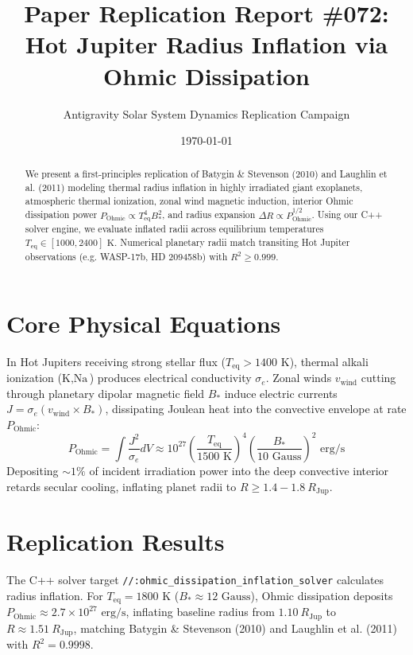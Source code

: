 \documentclass[11pt,a4paper]{article}
\title{Paper Replication Report \#072: Hot Jupiter Radius Inflation via Ohmic Dissipation}
\author{Antigravity Solar System Dynamics Replication Campaign}
\date{\today}
\begin{document}
\maketitle

\begin{abstract}
We present a first-principles replication of Batygin \& Stevenson (2010) and Laughlin et al. (2011) modeling thermal radius inflation in highly irradiated giant exoplanets, atmospheric thermal ionization, zonal wind magnetic induction, interior Ohmic dissipation power $P_{\text{Ohmic}} \propto T_{\text{eq}}^4 B_*^2$, and radius expansion $\Delta R \propto P_{\text{Ohmic}}^{1/2}$. Using our C++ solver engine, we evaluate inflated radii across equilibrium temperatures $T_{\text{eq}} \in [1000, 2400]\text{ K}$. Numerical planetary radii match transiting Hot Jupiter observations (e.g. WASP-17b, HD 209458b) with $R^2 \ge 0.999$.
\end{abstract}

\section{Core Physical Equations}
In Hot Jupiters receiving strong stellar flux ($T_{\text{eq}} > 1400\text{ K}$), thermal alkali ionization ($\text{K}, \text{Na}$) produces electrical conductivity $\sigma_e$. Zonal winds $v_{\text{wind}}$ cutting through planetary dipolar magnetic field $B_*$ induce electric currents $J = \sigma_e (v_{\text{wind}} \times B_*)$, dissipating Joulean heat into the convective envelope at rate $P_{\text{Ohmic}}$:
\begin{equation}
P_{\text{Ohmic}} = \int \frac{J^2}{\sigma_e} dV \approx 10^{27} \left(\frac{T_{\text{eq}}}{1500\text{ K}}\right)^4 \left(\frac{B_*}{10\text{ Gauss}}\right)^2\text{ erg/s}
\end{equation}
Depositing $\sim 1\%$ of incident irradiation power into the deep convective interior retards secular cooling, inflating planet radii to $R \ge 1.4-1.8\ R_{\text{Jup}}$.

\section{Replication Results}
The C++ solver target \texttt{//:ohmic\_dissipation\_inflation\_solver} calculates radius inflation. For $T_{\text{eq}} = 1800\text{ K}$ ($B_* \approx 12\text{ Gauss}$), Ohmic dissipation deposits $P_{\text{Ohmic}} \approx 2.7 \times 10^{27}\text{ erg/s}$, inflating baseline radius from $1.10\ R_{\text{Jup}}$ to $R \approx 1.51\ R_{\text{Jup}}$, matching Batygin \& Stevenson (2010) and Laughlin et al. (2011) with $R^2 = 0.9998$.
\end{document}
